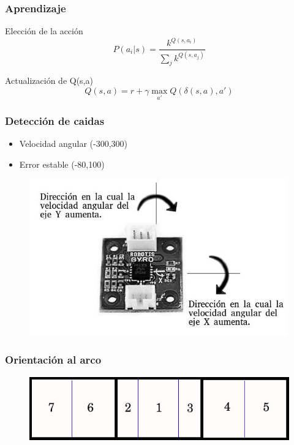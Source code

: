 \documentclass{beamer}
\begin{document}
\begin{frame}
\frametitle{Aprendizaje}

\begin{block}{Elecci\'on de la acci\'on}
\begin{equation}
 P(a_{i} | s) = \dfrac{k^{Q(s,a_{i})}}{\sum_{j}k^{Q(s,a_{j})}}
\end{equation}
\end{block} 

\begin{block}{Actualizaci\'on de Q(s,a)}
\begin{equation}
Q (s,a) = r + {\gamma\max_{a'}} Q(\delta(s ,a ) , a') 
\end{equation}
\end{block}

\end{frame}




\begin{frame}
\frametitle{Detecci\'on de caidas}

\begin{itemize}
 \item Velocidad angular (-300,300)
 \item Error estable (-80,100)
\end{itemize}

\begin{figure}[hbtp]
\centering
\includegraphics[scale=0.3]{gyroDireccion.jpg} 
\end{figure}

\end{frame}



\begin{frame}
\frametitle{Orientaci\'on al arco}

\begin{figure}[hbtp]
\centering
\includegraphics[scale=0.4]{RegionesArco.jpg} 
\end{figure}

\end{frame}
\end{document}
